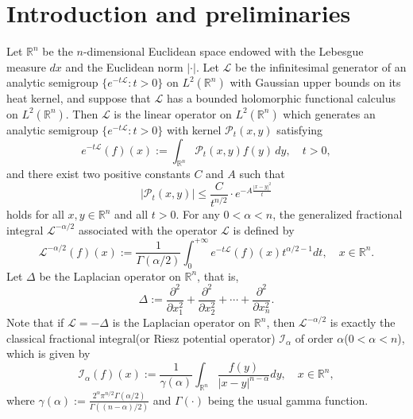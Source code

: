 \documentclass[10pt, reqno]{amsart}
\theoremstyle{definition}
\theoremstyle{remark}
\numberwithin{equation}{section}
\begin{document}
\maketitle

\section{Introduction and preliminaries}
\label{sec1}
Let $\mathbb R^n$ be the $n$-dimensional Euclidean space endowed with the Lebesgue measure $dx$ and the Euclidean norm $|\cdot|$. Let $\mathcal{L}$ be the infinitesimal generator of an analytic semigroup $\big\{e^{-t\mathcal L}:t>0\big\}$ on $L^2(\mathbb R^n)$ with Gaussian upper bounds on its heat kernel, and suppose that $\mathcal{L}$ has a bounded holomorphic functional calculus on $L^2(\mathbb R^n)$.  Then $\mathcal{L}$ is the linear operator on $L^2(\mathbb R^n)$ which generates an analytic semigroup $\big\{e^{-t\mathcal L}:t>0\big\}$ with kernel $\mathcal{P}_t(x,y)$ satisfying
\begin{equation*}
e^{-t\mathcal L}(f)(x):=\int_{\mathbb R^n}\mathcal{P}_t(x,y)f(y)\,dy, \quad t>0,
\end{equation*}
and there exist two positive constants $C$ and $A$ such that
\begin{equation}\label{G}
\big|\mathcal{P}_t(x,y)\big|\leq\frac{C}{t^{n/2}}\cdot e^{-A\frac{|x-y|^2}{t}}
\end{equation}
holds for all $x,y\in\mathbb R^n$ and all $t>0$. For any $0<\alpha<n$, the generalized fractional integral $\mathcal L^{-\alpha/2}$ associated with the operator $\mathcal{L}$ is defined by
\begin{equation}\label{gefrac}
\mathcal L^{-\alpha/2}(f)(x):=\frac{1}{\Gamma(\alpha/2)}\int_0^{+\infty}e^{-t\mathcal L}(f)(x)t^{\alpha/2-1}dt,\quad x\in\mathbb R^n.
\end{equation}
Let $\Delta$ be the Laplacian operator on $\mathbb R^n$, that is,
\begin{equation*}
\Delta:=\frac{\partial^2}{\partial x_1^2}+\frac{\partial^2}{\partial x_2^2}+\cdots+\frac{\partial^2}{\partial x_n^2}.
\end{equation*}
Note that if $\mathcal{L}=-\Delta$ is the Laplacian operator on $\mathbb R^n$, then $\mathcal L^{-\alpha/2}$ is exactly the classical fractional integral(or Riesz potential operator) $\mathcal{I}_{\alpha}$ of order $\alpha$($0<\alpha<n$), which is given by
\begin{equation*}
\mathcal{I}_{\alpha}(f)(x):=\frac{1}{\gamma(\alpha)}\int_{\mathbb R^n}\frac{f(y)}{|x-y|^{n-\alpha}}dy,\quad x\in\mathbb R^n,
\end{equation*}
where $\gamma(\alpha):=\frac{2^{\alpha}\pi^{n/2}\Gamma(\alpha/2)}{\Gamma({(n-\alpha)}/2)}$ and $\Gamma(\cdot)$ being the usual gamma function.
\end{document}
